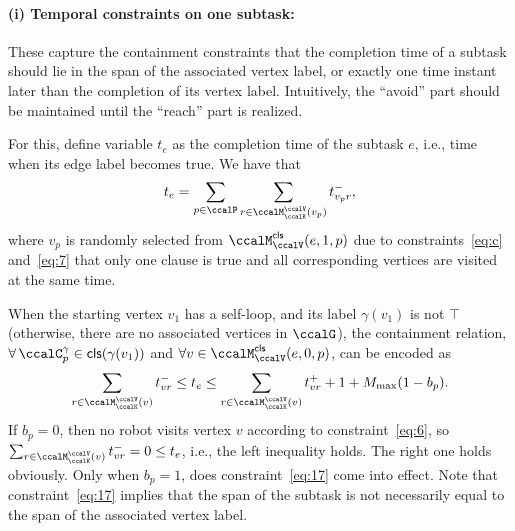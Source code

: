 \documentclass[Afour,sageh,times]{sagej}
\newcommand{\clause}[1]{\mathsf{cls}(#1)}
\begin{document}
{{{\paragraph{(i) Temporal constraints on one subtask:}\label{sec:onesubtask} These capture the containment constraints that the completion time of a subtask should lie in the span of the associated vertex label, or exactly one time instant later than the completion of its vertex label. Intuitively, the ``avoid'' part should be maintained until the ``reach'' part is realized.

For this, define variable  $t_e$ as the completion time of the subtask $e$, i.e., time when its edge label  becomes true. We have  that
\begingroup\makeatletter\def\f@size{10}\check@mathfonts
\def\maketag@@@#1{\hbox{\m@th\normalsize\normalfont#1}}%
\begin{align}\label{eq:edgetime}
  t_e = \sum_{p\in \ccalP} \sum_{r\in \ccalM^\ccalV_{\ccalK}(v_p)}t_{v_p r}^-,
\end{align}
\endgroup
where $v_p$ is randomly selected from $\ccalM^\mathsf{cls}_\ccalV(e,1,p)$ due to constraints~\eqref{eq:c} and~\eqref{eq:7} that only one clause is true and all corresponding vertices are visited at the same time.

When the starting vertex $v_1$ has a self-loop, and its label $\gamma(v_1)$ is not  $\top$ (otherwise, there are no associated vertices in $\ccalG$), the containment relation, $\forall\, \ccalC_p^{\gamma} \in \clause{\gamma(v_1)}$ and $\forall v \in \ccalM^\mathsf{cls}_\ccalV(e,0,p)$, can be encoded as
\begingroup\makeatletter\def\f@size{10}\check@mathfonts
\def\maketag@@@#1{\hbox{\m@th\normalsize\normalfont#1}}%
  \begin{align}
 \sum_{r\in \ccalM^\ccalV_{\ccalK}(v)} t_{vr}^-   \leq  t_e \leq
    \sum_{r\in \ccalM^\ccalV_{\ccalK}(v)} t_{vr}^+ + 1  + M_{\text{max}} (1 - b_{p}). \label{eq:17}
  \end{align}
  \endgroup
  If $b_p=0$, then no robot visits vertex $v$ according to constraint~\eqref{eq:6}, so~$ \sum_{r\in \ccalM^\ccalV_{\ccalK}(v)} t_{vr}^- = 0 \leq t_e$, i.e., the left inequality holds. The right one holds obviously. Only when $b_p=1$, does constraint~\eqref{eq:17} come into effect. Note that constraint~\eqref{eq:17} implies that the span of the subtask is not necessarily equal to the span of the associated vertex label.

}}}
\end{document}
